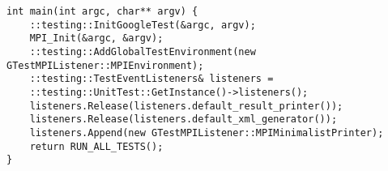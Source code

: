 \documentclass{report}
\begin{document}
\begin{lstlisting}
int main(int argc, char** argv) {
	::testing::InitGoogleTest(&argc, argv);
	MPI_Init(&argc, &argv);
	::testing::AddGlobalTestEnvironment(new GTestMPIListener::MPIEnvironment);
	::testing::TestEventListeners& listeners =
	::testing::UnitTest::GetInstance()->listeners();
	listeners.Release(listeners.default_result_printer());
	listeners.Release(listeners.default_xml_generator());
	listeners.Append(new GTestMPIListener::MPIMinimalistPrinter);
	return RUN_ALL_TESTS();
}
\end{lstlisting}
\end{document}
